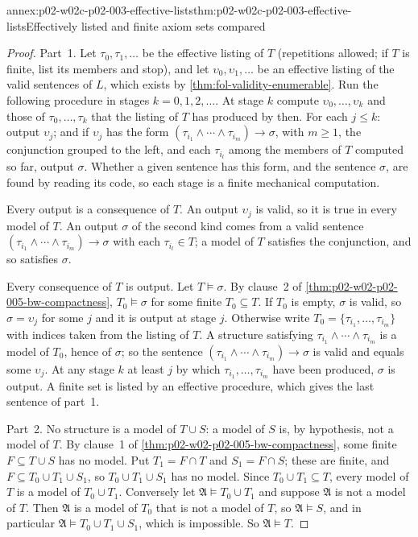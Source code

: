 \begin{annexitem}{annex:p02-w02c-p02-003-effective-lists}{thm:p02-w02c-p02-003-effective-lists}{Effectively listed and finite axiom sets compared}
\begin{proof}
Part~1.  Let \(\tau_0,\tau_1,\ldots\) be the effective listing of \(T\)
(repetitions allowed; if \(T\) is finite, list its members and stop), and
let \(\upsilon_0,\upsilon_1,\ldots\) be an effective listing of the valid
sentences of \(L\), which exists by \cref{thm:fol-validity-enumerable}.
Run the following procedure in stages \(k=0,1,2,\ldots\).  At stage \(k\)
compute \(\upsilon_0,\ldots,\upsilon_k\) and those of
\(\tau_0,\ldots,\tau_k\) that the listing of \(T\) has produced by then.
For each \(j\leq k\): output \(\upsilon_j\); and if \(\upsilon_j\) has the
form \((\tau_{i_1}\land\cdots\land\tau_{i_m})\to\sigma\), with \(m\geq1\),
the conjunction grouped to the left, and each \(\tau_{i_l}\) among the
members of \(T\) computed so far, output \(\sigma\).  Whether a given
sentence has this form, and the sentence \(\sigma\), are found by reading
its code, so each stage is a finite mechanical computation.

Every output is a consequence of \(T\).  An output \(\upsilon_j\) is valid,
so it is true in every model of \(T\).  An output \(\sigma\) of the second
kind comes from a valid sentence
\((\tau_{i_1}\land\cdots\land\tau_{i_m})\to\sigma\) with each
\(\tau_{i_l}\in T\); a model of \(T\) satisfies the conjunction, and so
satisfies \(\sigma\).

Every consequence of \(T\) is output.  Let \(T\models\sigma\).  By clause~2
of \cref{thm:p02-w02-p02-005-bw-compactness}, \(T_0\models\sigma\) for some
finite \(T_0\subseteq T\).  If \(T_0\) is empty, \(\sigma\) is valid, so
\(\sigma=\upsilon_j\) for some \(j\) and it is output at stage \(j\).
Otherwise write \(T_0=\{\tau_{i_1},\ldots,\tau_{i_m}\}\) with indices taken
from the listing of \(T\).  A structure satisfying
\(\tau_{i_1}\land\cdots\land\tau_{i_m}\) is a model of \(T_0\), hence of
\(\sigma\); so the sentence
\((\tau_{i_1}\land\cdots\land\tau_{i_m})\to\sigma\) is valid and equals
some \(\upsilon_j\).  At any stage \(k\) at least \(j\) by which
\(\tau_{i_1},\ldots,\tau_{i_m}\) have been produced, \(\sigma\) is output.
A finite set is listed by an effective procedure, which gives the last
sentence of part~1.

Part~2.  No structure is a model of \(T\cup S\): a model of \(S\) is, by
hypothesis, not a model of \(T\).  By clause~1 of
\cref{thm:p02-w02-p02-005-bw-compactness}, some finite
\(F\subseteq T\cup S\) has no model.  Put \(T_1=F\cap T\) and
\(S_1=F\cap S\); these are finite, and \(F\subseteq T_0\cup T_1\cup S_1\),
so \(T_0\cup T_1\cup S_1\) has no model.  Since \(T_0\cup T_1\subseteq T\),
every model of \(T\) is a model of \(T_0\cup T_1\).  Conversely let
\(\mathfrak A\models T_0\cup T_1\) and suppose \(\mathfrak A\) is not a
model of \(T\).  Then \(\mathfrak A\) is a model of \(T_0\) that is not a
model of \(T\), so \(\mathfrak A\models S\), and in particular
\(\mathfrak A\models T_0\cup T_1\cup S_1\), which is impossible.  So
\(\mathfrak A\models T\).


\end{proof}
\end{annexitem}
